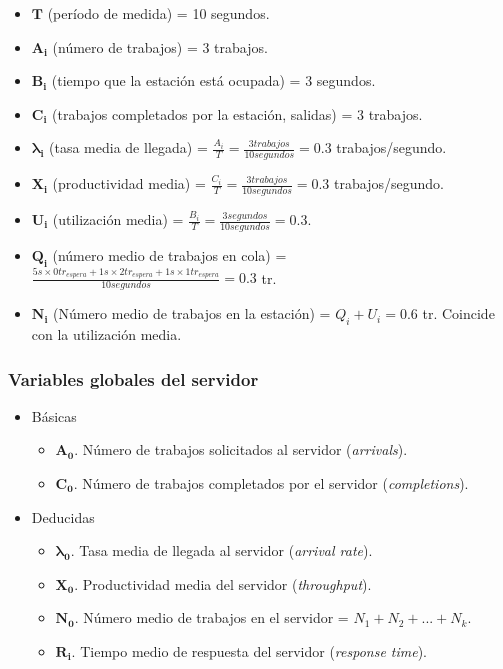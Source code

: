 \documentclass[12pt,spanish]{article}
\begin{document}
\begin{itemize}
	\item $\pmb{T}$ (período de medida) = 10 segundos.
	\item $\pmb{A_i}$ (número de trabajos) = 3 trabajos.
	\item $\pmb{B_i}$ (tiempo que la estación está ocupada) = 3 segundos.
	\item $\pmb{C_i}$ (trabajos completados por la estación, salidas) = 3 trabajos.
	\item $\pmb{\lambda_i}$ (tasa media de llegada) = $\frac{A_i}{T}=\frac{3 trabajos}{10 segundos} = 0.3$ trabajos/segundo.
	\item $\pmb{X_i}$ (productividad media) = $\frac{C_i}{T}=\frac{3 trabajos}{10 segundos} = 0.3$ trabajos/segundo.
	\item $\pmb{U_i}$ (utilización media) = $\frac{B_i}{T}=\frac{3 segundos}{10 segundos} = 0.3$.
	\item $\pmb{Q_i}$ (número medio de trabajos en cola) = $\frac{5 s \times 0 tr_{espera} + 1 s \times 2 tr_{espera} + 1 s \times 1 tr_{espera}}{10 segundos} = 0.3$ tr.
	\item $\pmb{N_i}$ (Número medio de trabajos en la estación) = $Q_i + U_i = 0.6$ tr. Coincide con la utilización media.
\end{itemize}

\subsubsection{Variables globales del servidor}

\begin{itemize}
	\item Básicas
		\begin{itemize}
			\item $\pmb{A_0}$. Número de trabajos solicitados al servidor (\textit{arrivals}).
			\item $\pmb{C_0}$. Número de trabajos completados por el servidor (\textit{completions}).
		\end{itemize}
	\item Deducidas
		\begin{itemize}
			\item $\pmb{\lambda_0}$. Tasa media de llegada al servidor (\textit{arrival rate}).
			\item $\pmb{X_0}$. Productividad media del servidor (\textit{throughput}).
			\item $\pmb{N_0}$. Número medio de trabajos en el servidor = $N_1+N_2+...+N_k$.
			\item $\pmb{R_i}$. Tiempo medio de respuesta del servidor (\textit{response time}).
		\end{itemize}
\end{itemize}
\end{document}
